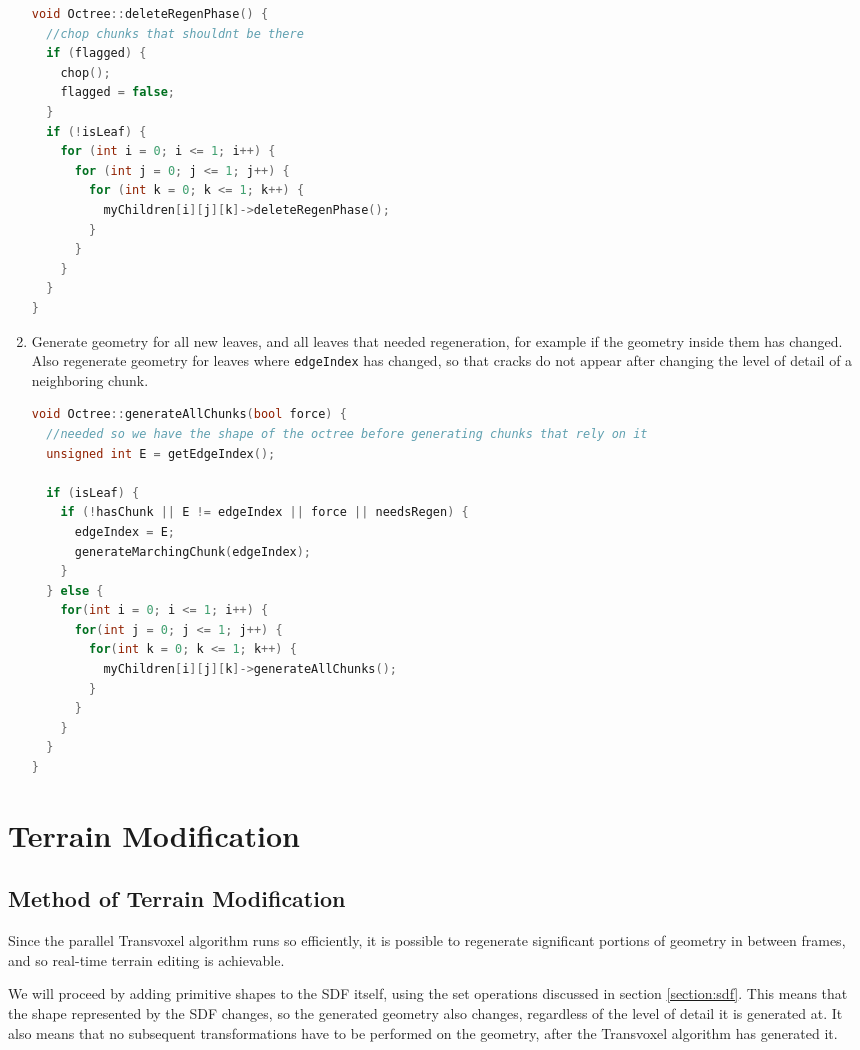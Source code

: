 \documentclass[11pt]{article}
\begin{document}
\begin{enumerate}
  \begin{lstlisting}[language=C++,label={deleteregenphase},caption={The third stage in the octree refinement process.}]
void Octree::deleteRegenPhase() {
  //chop chunks that shouldnt be there
  if (flagged) {
    chop();
    flagged = false;
  }
  if (!isLeaf) {
    for (int i = 0; i <= 1; i++) {
      for (int j = 0; j <= 1; j++) {
        for (int k = 0; k <= 1; k++) {
          myChildren[i][j][k]->deleteRegenPhase();
        }
      }
    }
  }  
}
  \end{lstlisting}
  \item Generate geometry for all new leaves, and all leaves that needed regeneration, for example if the geometry inside them has changed. Also regenerate geometry for leaves where \texttt{edgeIndex} has changed, so that cracks do not appear after changing the level of detail of a neighboring chunk.
  \begin{lstlisting}[language=C++,label={generateallchunks},caption={The fourth stage in the octree refinement process.}]
void Octree::generateAllChunks(bool force) {
  //needed so we have the shape of the octree before generating chunks that rely on it
  unsigned int E = getEdgeIndex();

  if (isLeaf) {
    if (!hasChunk || E != edgeIndex || force || needsRegen) {
      edgeIndex = E;
      generateMarchingChunk(edgeIndex);
    }
  } else {
    for(int i = 0; i <= 1; i++) {
      for(int j = 0; j <= 1; j++) {
        for(int k = 0; k <= 1; k++) {
          myChildren[i][j][k]->generateAllChunks();
        }
      }
    }
  }
}
  \end{lstlisting}
\end{enumerate}

\section{Terrain Modification}
\subsection{Method of Terrain Modification}
Since the parallel Transvoxel algorithm runs so efficiently, it is possible to regenerate significant portions of geometry in between frames, and so real-time terrain editing is achievable. 

We will proceed by adding primitive shapes to the SDF itself, using the set operations discussed in section \ref{section:sdf}. This means that the shape represented by the SDF changes, so the generated geometry also changes, regardless of the level of detail it is generated at. It also means that no subsequent transformations have to be performed on the geometry, after the Transvoxel algorithm has generated it.
\end{document}
